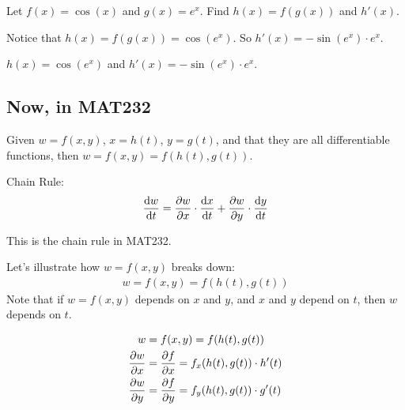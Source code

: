 \documentclass{article}
\begin{document}
\begin{examplebox}
    Let \( f(x) = \cos(x) \) and \( g(x) = e^x \). Find \( h(x) = f(g(x)) \) and \( h'(x) \).

    \begin{solutionbox}
        Notice that \( h(x) = f(g(x)) = \cos(e^x) \).
        So \( h'(x) = -\sin(e^x) \cdot e^x \).
        \begin{answerbox}
            \( h(x) = \cos(e^x) \) and \( h'(x) = -\sin(e^x) \cdot e^x \).
        \end{answerbox}
    \end{solutionbox}
\end{examplebox}

\subsection*{Now, in MAT232}

\begin{definitionbox}
    Given \( w = f(x, y) \), \( x = h(t) \), \( y = g(t) \), and that they are all differentiable functions, then \( w = f(x, y) = f(h(t), g(t)) \).
    \begin{conceptbox}
        Chain Rule:
        \[
            \dv{w}{t} = \pdv{w}{x} \cdot \dv{x}{t} + \pdv{w}{y} \cdot \dv{y}{t}
        \]
    \end{conceptbox}
    \begin{notebox}
        This is the chain rule in MAT232.
    \end{notebox}
\end{definitionbox}

Let's illustrate how \( w = f(x, y) \) breaks down:
\begin{align*}
    w = f(x, y) = f(h(t), g(t))
\end{align*}
Note that if \( w = f(x, y) \) depends on \( x \) and \( y \), and \( x \) and \( y \) depend on \( t \), then \( w \) depends on \( t \).

\begin{align*}
    w &= f(x, y) = f(h(t), g(t)) \\
    \pdv{w}{x} &= \pdv{f}{x} = f_x(h(t), g(t)) \cdot h'(t) \\
    \pdv{w}{y} &= \pdv{f}{y} = f_y(h(t), g(t)) \cdot g'(t)
\end{align*}
\end{document}
